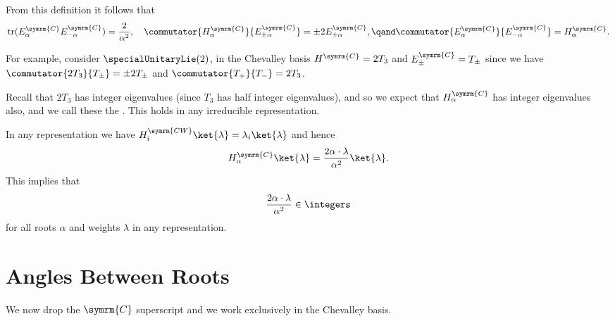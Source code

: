 \documentclass[fleqn]{NotesClass}
\DeclareMathOperator{\tr}{tr}
\begin{document}
    From this definition it follows that
    \begin{equation}
        \tr(E_\alpha^{\symrm{C}} E_{-\alpha}^{\symrm{C}}) = \frac{2}{\alpha^2}, \quad \commutator{H_\alpha^{\symrm{C}}}{E_{\pm\alpha}^{\symrm{C}}} = \pm 2 E_{\pm \alpha}^{\symrm{C}}, \qand \commutator{E_{\alpha}^{\symrm{C}}}{E_{-\alpha}^{\symrm{C}}} = H_\alpha^{\symrm{C}}.
    \end{equation}
    
    For example, consider \(\specialUnitaryLie(2)\), in the Chevalley basis \(H^{\symrm{C}} = 2T_3\) and \(E_{\pm}^{\symrm{C}} = T_{\pm}\) since we have \(\commutator{2T_3}{T_{\pm}} = \pm 2 T_{\pm}\) and \(\commutator{T_{+}}{T_{-}} = 2T_3\).
    
    Recall that \(2T_3\) has integer eigenvalues (since \(T_3\) has half integer eigenvalues), and so we expect that \(H_\alpha^{\symrm{C}}\) has integer eigenvalues also, and we call these the .
    This holds in any irreducible representation.
    
    In any representation we have \(H_i^{\symrm{CW}} \ket{\lambda} = \lambda_i \ket{\lambda}\) and hence
    \begin{equation}
        H_\alpha^{\symrm{C}} \ket{\lambda} = \frac{2 \alpha \cdot \lambda}{\alpha^2} \ket{\lambda}.
    \end{equation}
    This implies that
    \begin{equation}
        \frac{2\alpha \cdot \lambda}{\alpha^2} \in \integers
    \end{equation}
    for all roots \(\alpha\) and weights \(\lambda\) in any representation.
    
    \section{Angles Between Roots}
    \begin{rmk}
        We now drop the \(\symrm{C}\) superscript and we work exclusively in the Chevalley basis.
    \end{rmk}
    
\end{document}

